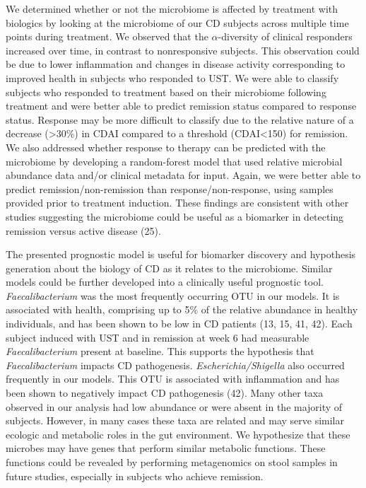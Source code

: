 \documentclass[11pt,]{article}
\begin{document}
We determined whether or not the microbiome is affected by treatment
with biologics by looking at the microbiome of our CD subjects across
multiple time points during treatment. We observed that the
\({\alpha}\)-diversity of clinical responders increased over time, in
contrast to nonresponsive subjects. This observation could be due to
lower inflammation and changes in disease activity corresponding to
improved health in subjects who responded to UST. We were able to
classify subjects who responded to treatment based on their microbiome
following treatment and were better able to predict remission status
compared to response status. Response may be more difficult to classify
due to the relative nature of a decrease (\textgreater{}30\%) in CDAI
compared to a threshold (CDAI\textless{}150) for remission. We also
addressed whether response to therapy can be predicted with the
microbiome by developing a random-forest model that used relative
microbial abundance data and/or clinical metadata for input. Again, we
were better able to predict remission/non-remission than
response/non-response, using samples provided prior to treatment
induction. These findings are consistent with other studies suggesting
the microbiome could be useful as a biomarker in detecting remission
versus active disease (25).

The presented prognostic model is useful for biomarker discovery and
hypothesis generation about the biology of CD as it relates to the
microbiome. Similar models could be further developed into a clinically
useful prognostic tool. \emph{Faecalibacterium} was the most frequently
occurring OTU in our models. It is associated with health, comprising up
to 5\% of the relative abundance in healthy individuals, and has been
shown to be low in CD patients (13, 15, 41, 42). Each subject induced
with UST and in remission at week 6 had measurable
\emph{Faecalibacterium} present at baseline. This supports the
hypothesis that \emph{Faecalibacterium} impacts CD pathogenesis.
\emph{Escherichia/Shigella} also occurred frequently in our models. This
OTU is associated with inflammation and has been shown to negatively
impact CD pathogenesis (42). Many other taxa observed in our analysis
had low abundance or were absent in the majority of subjects. However,
in many cases these taxa are related and may serve similar ecologic and
metabolic roles in the gut environment. We hypothesize that these
microbes may have genes that perform similar metabolic functions. These
functions could be revealed by performing metagenomics on stool samples
in future studies, especially in subjects who achieve remission.
\end{document}
